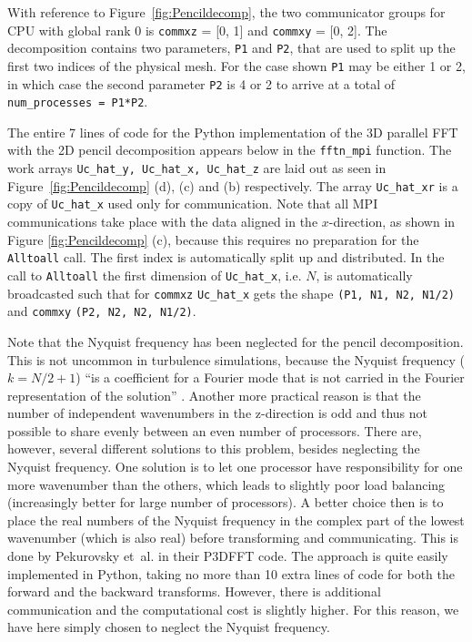 \documentclass[final,1p,times]{elsarticle}
\newcommand{\inpyth}{\lstinline[style=inlinestyle]} %[]%
\begin{document}
With reference to Figure~\ref{fig:Pencildecomp}, the two communicator groups for CPU with global rank 0 is
\inpyth{commxz} = [0, 1] and \inpyth{commxy} = [0, 2]. The decomposition contains two parameters, \inpyth{P1} and \inpyth{P2}, that are used to split up the first two indices of the physical mesh.
For the case shown \inpyth{P1} may be either 1 or 2, in which case the second parameter \inpyth{P2}
is 4 or 2 to arrive at a total of \inpyth{num_processes = P1*P2}.

The entire 7 lines of code for the Python implementation of the 3D parallel FFT with the 2D pencil
decomposition appears below in the \inpyth{fftn_mpi} function. The work arrays \inpyth{Uc_hat_y, Uc_hat_x, Uc_hat_z} are laid out as seen in Figure~\ref{fig:Pencildecomp} (d), (c) and (b) respectively. The array
\inpyth{Uc_hat_xr} is a copy of \inpyth{Uc_hat_x} used only for communication. Note that all MPI
communications take place with the data aligned in the $x$-direction, as shown in Figure
\ref{fig:Pencildecomp} (c), because this requires no preparation for the \inpyth{Alltoall} call. The first
index is automatically split up and distributed.  In the call to \inpyth{Alltoall} the first dimension of
\inpyth{Uc_hat_x}, i.e. $N$, is automatically broadcasted such that for \inpyth{commxz} \inpyth{Uc_hat_x}
gets the shape \inpyth{(P1, N1, N2, N1/2)} and \inpyth{commxy} \inpyth{(P2, N2, N2, N1/2)}.

Note that the Nyquist frequency has been neglected for the pencil decomposition. This is not uncommon in
turbulence simulations, because the Nyquist frequency ($k=N/2+1$) ``is a coefficient for a Fourier mode
that is not carried in the Fourier representation of the solution'' \cite{Lee2013}.  Another more practical
reason is that the number of independent wavenumbers in the z-direction is odd and thus not possible to share evenly
between an even number of processors. There are, however, several different solutions to this problem,
besides neglecting the Nyquist frequency. One solution is to let one processor have responsibility for one
more wavenumber than the others, which leads to slightly poor load balancing (increasingly better for large
number of processors). A better choice then is to place the real numbers of the Nyquist frequency in the
complex part of the lowest wavenumber (which is also real) before transforming and communicating. This is
done by Pekurovsky et~al. \cite{pekurovsky2012} in their P3DFFT code. The approach is quite easily
implemented in Python, taking no more than 10 extra lines of code for both the forward and the backward
transforms. However, there is additional communication and the computational cost is slightly higher. For
this reason, we have here simply chosen to neglect the Nyquist frequency.
\end{document}
